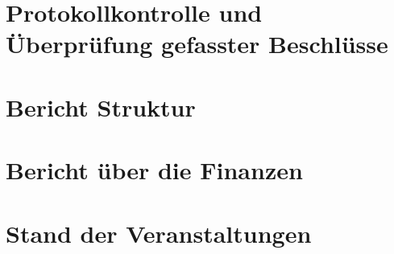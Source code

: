 \documentclass{fsrprotokoll}
\begin{document}

\date{}  %
\attendeesNumber{}  %
\chairperson{}
\clerks{}
\meetingStart{}  %
\meetingEnd{}  %
\attendees{}
\excused{}
\unexcused{}
\resting{}

\maketitle

\section{Protokollkontrolle und Überprüfung gefasster Beschlüsse}


\section{Bericht Struktur}

\section{Bericht über die Finanzen}



\section{Stand der Veranstaltungen}
\end{document}
